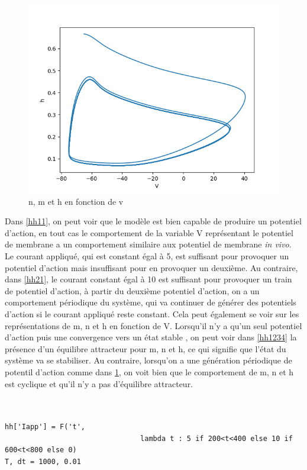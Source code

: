 \documentclass[12pt]{scrartcl}
\begin{document}
\begin{figure}[!h]
\begin{minipage}[l]{.3\linewidth}
\includegraphics[scale=0.35]{imgs/hh24.png}
    \end{minipage}\hfill
\caption{n, m et h en fonction de v}
\label{hh2234}
\end{figure}

Dans \ref{hh11}, on peut voir que le modèle est bien capable de produire un potentiel d'action, en tout cas le comportement de la variable V représentant le potentiel de membrane a un comportement similaire aux potentiel de membrane \textit{in vivo}. Le courant appliqué, qui est constant égal à 5, est suffisant pour provoquer un potentiel d'action mais insuffisant pour en provoquer un deuxième. Au contraire, dans \ref{hh21}, le courant constant égal à 10 est suffisant pour provoquer un train de potentiel d'action, à partir du deuxième potentiel d'action, on a un comportement périodique du système, qui va continuer de générer des potentiels d'action si le courant appliqué reste constant. Cela peut également se voir sur les représentations de m, n et h en fonction de V. Lorsqu'il n'y a qu'un seul potentiel d'action puis une convergence vers un état stable , on peut voir dans \ref{hh1234} la présence d'un équilibre attracteur pour m, n et h, ce qui signifie que l'état du système va se stabiliser. Au contraire, lorsqu'on a une génération périodique de potentil d'action comme dans \ref{hh2234}, on voit bien que le comportement de m, n et h est cyclique et qu'il n'y a pas d'équilibre attracteur.\\\\\\

\begin{lstlisting}[caption = {Simulation du modèle 3}]
hh['Iapp'] = F('t', 
								lambda t : 5 if 200<t<400 else 10 if 600<t<800 else 0)
T, dt = 1000, 0.01
\end{lstlisting}
\end{document}
